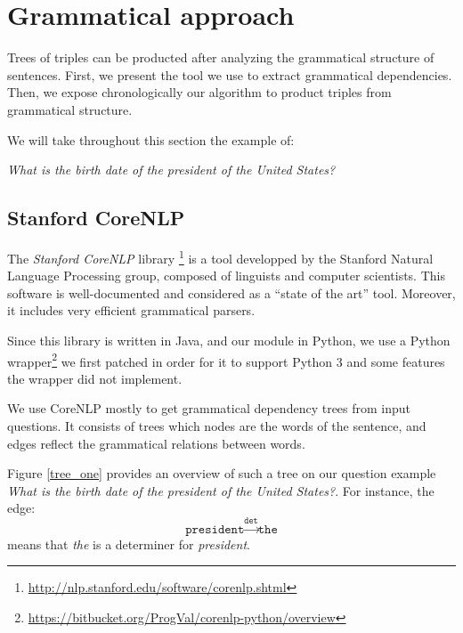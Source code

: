 \section{Grammatical approach}

Trees of triples can be producted after analyzing the grammatical structure of sentences. First, we  present the tool we use to extract grammatical dependencies. Then, we expose chronologically our algorithm to product triples from grammatical structure.

We will take throughout this section the example of:
\begin{center}
 \textit{What is the birth date of the president of the United States?}
\end{center}


\subsection{Stanford CoreNLP}

The \emph{Stanford CoreNLP} library \footnote{\url{http://nlp.stanford.edu/software/corenlp.shtml}} is a tool developped by the Stanford Natural Language Processing group, composed of linguists and computer scientists. This software is well-documented and considered as a ``state of the art'' tool. Moreover, it includes very efficient grammatical parsers.

Since this library is written in Java, and our module in Python, we use a Python wrapper\footnote{\url{https://bitbucket.org/ProgVal/corenlp-python/overview}} we first patched in order for it to support Python 3 and some features the wrapper did not implement.

We use CoreNLP mostly to get grammatical dependency trees from input questions. It consists of trees which nodes are the words of the sentence, and edges reflect the grammatical relations between words.

Figure \ref{tree_one} provides an overview of such a tree on our question example \emph{What is the birth date of the president of the United States?}. For instance, the edge:
  \[\texttt{president}\xrightarrow{\texttt{det}}\texttt{the}\]
means that \emph{the} is a determiner for \emph{president}.

